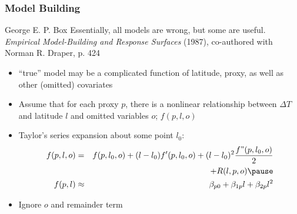 \documentclass[handout]{beamer}
\begin{document}
\begin{frame}
  \frametitle{Model Building}
  \begin{block}{George E. P. Box}
    Essentially, all models are wrong, but some are useful.
{\it Empirical Model-Building and Response Surfaces} (1987), co-authored with Norman R. Draper, p. 424
  \end{block} \pause
  \begin{itemize}
  \item
``true'' model may be a complicated function of latitude, proxy, as
well as other (omitted) covariates \pause
\item Assume that for each proxy $p$, there is a nonlinear relationship
  between $\Delta T$ and latitude $l$ and omitted variables $o$; $f(p, l, o)$ \pause
\item Taylor's series expansion about some point $l_0$:
  \begin{eqnarray*}
 f(p, l, o) & = &f(p, l_0, o) + (l - l_0)f'(p, l_0, o) + (l - l_0)^2 \frac{f"(p,
  l_0, o)}{2}\\
&  &  + R(l, p, o) \pause \\
f(p, l) & \approx &\beta_{p0} + \beta_{1p} l + \beta_{2p} l^2
\end{eqnarray*} \pause
\item Ignore $o$ and  remainder term
\end{itemize}
\end{frame}
\end{document}
